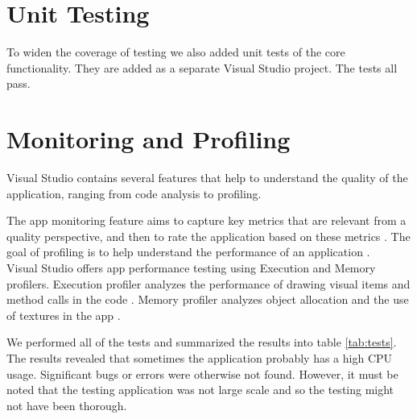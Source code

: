 

\section{Unit Testing}
To widen the coverage of testing we also added unit tests of the core functionality. They are added as a separate Visual Studio project. The tests all pass.

\section{Monitoring and Profiling}
Visual Studio contains several features that help to understand the quality of the application, ranging from code analysis to profiling.

The app monitoring feature aims to capture key metrics that are relevant from a quality perspective, and then to rate the application based on these metrics \cite{wp8monitoring}. The goal of profiling is to help understand the performance of an application \cite{wp8profiling}.\\

Visual Studio offers app performance testing using Execution and Memory profilers. Execution profiler analyzes the performance of drawing visual items and method calls in the code \cite{wp8profiling}. Memory profiler analyzes object allocation and the use of textures in the app \cite{wp8profiling}.

We performed all of the tests and summarized the results into table \ref{tab:tests}. The results revealed that sometimes the application probably has a high CPU usage. Significant bugs or errors were otherwise not found. However, it must be noted that the testing application was not large scale and so the testing might not have been thorough.



